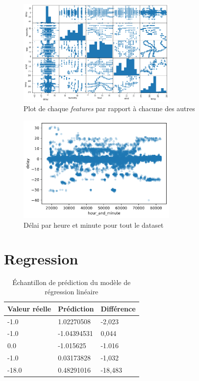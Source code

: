 \begin{appendices}
    \begin{figure}[ht]
        \centering
        \includegraphics[width=0.7\textwidth]{images/scatter_matrix.png}
        \caption{Plot de chaque \textit{features} par rapport à chacune des autres}
        \label{appendix:scatter_matrix}
    \end{figure}

    \begin{figure}[ht]
        \centering
        \includegraphics[width=0.7\textwidth]{images/delay_per_hour_and_minute.png}
        \caption{Délai par heure et minute pour tout le dataset}
        \label{appendix:delay_per_hour_and_minute}
    \end{figure}

    \chapter{Regression}
    \begin{table}[ht]
    \begin{tabular}{l|l|l}
        \textbf{Valeur réelle}&\textbf{Prédiction}&\textbf{Différence} \\
        \hline
        -1.0&1.02270508&-2,023 \\
        \hline
        -1.0&-1.04394531&0,044 \\
        \hline
        0.0&-1.015625&-1.016 \\
        \hline
        -1.0&0.03173828&-1,032 \\
        \hline
        -18.0&0.48291016&-18,483 \\
    \end{tabular}
    \caption{Échantillon de prédiction du modèle de régression linéaire}
    \label{appendix:linearReg}
    \end{table}


\end{appendices}
